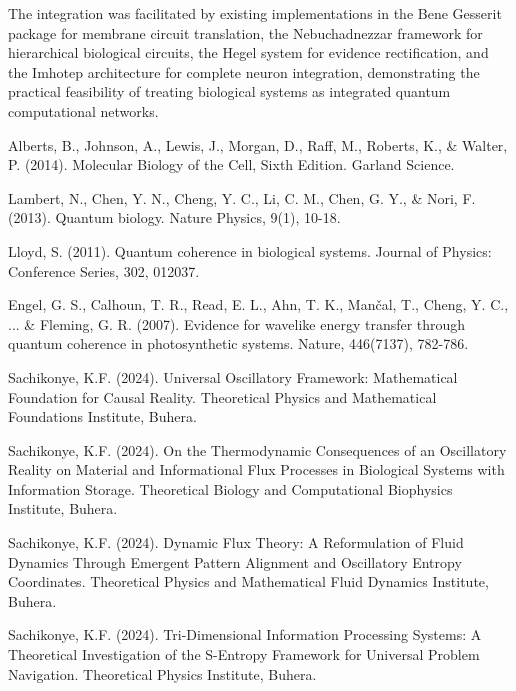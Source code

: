 \documentclass[12pt,a4paper]{article}
\begin{document}
The integration was facilitated by existing implementations in the Bene Gesserit package for membrane circuit translation, the Nebuchadnezzar framework for hierarchical biological circuits, the Hegel system for evidence rectification, and the Imhotep architecture for complete neuron integration, demonstrating the practical feasibility of treating biological systems as integrated quantum computational networks.

\begin{thebibliography}{99}

Alberts, B., Johnson, A., Lewis, J., Morgan, D., Raff, M., Roberts, K., \& Walter, P. (2014). Molecular Biology of the Cell, Sixth Edition. Garland Science.

Lambert, N., Chen, Y. N., Cheng, Y. C., Li, C. M., Chen, G. Y., \& Nori, F. (2013). Quantum biology. Nature Physics, 9(1), 10-18.

Lloyd, S. (2011). Quantum coherence in biological systems. Journal of Physics: Conference Series, 302, 012037.

Engel, G. S., Calhoun, T. R., Read, E. L., Ahn, T. K., Mančal, T., Cheng, Y. C., ... \& Fleming, G. R. (2007). Evidence for wavelike energy transfer through quantum coherence in photosynthetic systems. Nature, 446(7137), 782-786.

Sachikonye, K.F. (2024). Universal Oscillatory Framework: Mathematical Foundation for Causal Reality. Theoretical Physics and Mathematical Foundations Institute, Buhera.

Sachikonye, K.F. (2024). On the Thermodynamic Consequences of an Oscillatory Reality on Material and Informational Flux Processes in Biological Systems with Information Storage. Theoretical Biology and Computational Biophysics Institute, Buhera.

Sachikonye, K.F. (2024). Dynamic Flux Theory: A Reformulation of Fluid Dynamics Through Emergent Pattern Alignment and Oscillatory Entropy Coordinates. Theoretical Physics and Mathematical Fluid Dynamics Institute, Buhera.

Sachikonye, K.F. (2024). Tri-Dimensional Information Processing Systems: A Theoretical Investigation of the S-Entropy Framework for Universal Problem Navigation. Theoretical Physics Institute, Buhera.


\end{thebibliography}
\end{document}
